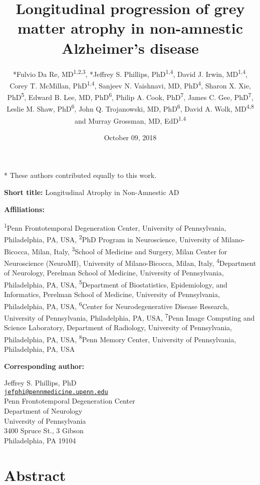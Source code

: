 \documentclass[]{article}
\title{Longitudinal progression of grey matter atrophy in non-amnestic
Alzheimer's disease}
\author{*Fulvio Da Re, MD\textsuperscript{1,2,3}, *Jeffrey S. Phillips,
PhD\textsuperscript{1,4}, David J. Irwin, MD\textsuperscript{1,4}, Corey
T. McMillan, PhD\textsuperscript{1,4}, Sanjeev N. Vaishnavi, MD,
PhD\textsuperscript{4}, Sharon X. Xie, PhD\textsuperscript{5}, Edward B.
Lee, MD, PhD\textsuperscript{6}, Philip A. Cook, PhD\textsuperscript{7},
James C. Gee, PhD\textsuperscript{7}, Leslie M. Shaw,
PhD\textsuperscript{6}, John Q. Trojanowski, MD, PhD\textsuperscript{6},
David A. Wolk, MD\textsuperscript{4,8} and Murray Grossman, MD,
EdD\textsuperscript{1,4}}
\date{October 09, 2018}
\begin{document}
\maketitle


* These authors contributed equally to this work.

\textbf{Short title:} Longitudinal Atrophy in Non-Amnestic AD

\textbf{Affiliations:}

\textsuperscript{1}Penn Frontotemporal Degeneration Center, University
of Pennsylvania, Philadelphia, PA, USA, \textsuperscript{2}PhD Program
in Neuroscience, University of Milano-Bicocca, Milan, Italy,
\textsuperscript{3}School of Medicine and Surgery, Milan Center for
Neuroscience (NeuroMI), University of Milano-Bicocca, Milan, Italy,
\textsuperscript{4}Department of Neurology, Perelman School of Medicine,
University of Pennsylvania, Philadelphia, PA, USA,
\textsuperscript{5}Department of Biostatistics, Epidemiology, and
Informatics, Perelman School of Medicine, University of Pennsylvania,
Philadelphia, PA, USA, \textsuperscript{6}Center for Neurodegenerative
Disease Research, University of Pennsylvania, Philadelphia, PA, USA,
\textsuperscript{7}Penn Image Computing and Science Laboratory,
Department of Radiology, University of Pennsylvania, Philadelphia, PA,
USA, \textsuperscript{8}Penn Memory Center, University of Pennsylvania,
Philadelphia, PA, USA

\textbf{Corresponding author:}

Jeffrey S. Phillips, PhD\\
\href{mailto:jefphi@pennmedicine.upenn.edu}{\nolinkurl{jefphi@pennmedicine.upenn.edu}}\\
Penn Frontotemporal Degeneration Center\\
Department of Neurology\\
University of Pennsylvania\\
3400 Spruce St., 3 Gibson\\
Philadelphia, PA 19104

\newpage


\section*{Abstract}\label{abstract}
\end{document}
